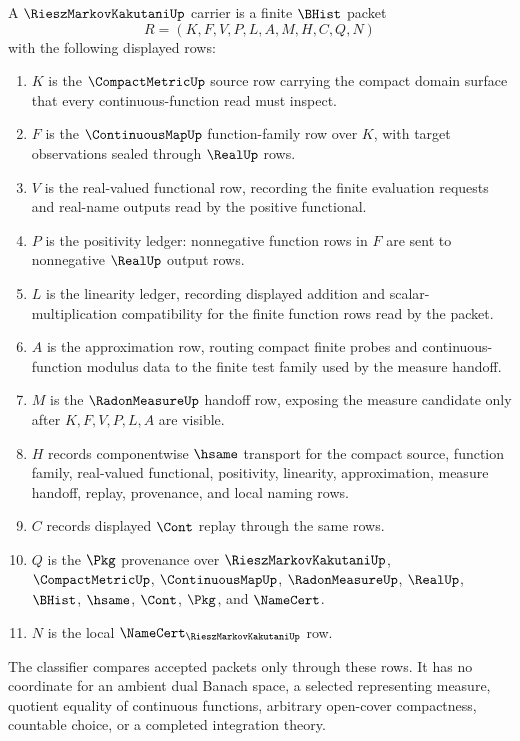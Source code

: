 \begin{definition}
\label{def:riesz-markov-kakutani-carrier}
A $\RieszMarkovKakutaniUp$ carrier is a finite $\BHist$ packet
$$
R=(K,F,V,P,L,A,M,H,C,Q,N)
$$
with the following displayed rows:
\begin{enumerate}
\item $K$ is the $\CompactMetricUp$ source row carrying the compact domain surface that every continuous-function read must inspect.
\item $F$ is the $\ContinuousMapUp$ function-family row over $K$, with target observations sealed through $\RealUp$ rows.
\item $V$ is the real-valued functional row, recording the finite evaluation requests and real-name outputs read by the positive functional.
\item $P$ is the positivity ledger: nonnegative function rows in $F$ are sent to nonnegative $\RealUp$ output rows.
\item $L$ is the linearity ledger, recording displayed addition and scalar-multiplication compatibility for the finite function rows read by the packet.
\item $A$ is the approximation row, routing compact finite probes and continuous-function modulus data to the finite test family used by the measure handoff.
\item $M$ is the $\RadonMeasureUp$ handoff row, exposing the measure candidate only after $K,F,V,P,L,A$ are visible.
\item $H$ records componentwise $\hsame$ transport for the compact source, function family, real-valued functional, positivity, linearity, approximation, measure handoff, replay, provenance, and local naming rows.
\item $C$ records displayed $\Cont$ replay through the same rows.
\item $Q$ is the $\Pkg$ provenance over $\RieszMarkovKakutaniUp$, $\CompactMetricUp$, $\ContinuousMapUp$, $\RadonMeasureUp$, $\RealUp$, $\BHist$, $\hsame$, $\Cont$, $\Pkg$, and $\NameCert$.
\item $N$ is the local $\NameCert_{\RieszMarkovKakutaniUp}$ row.
\end{enumerate}
The classifier compares accepted packets only through these rows. It has no coordinate for an ambient dual Banach space, a selected representing measure, quotient equality of continuous functions, arbitrary open-cover compactness, countable choice, or a completed integration theory.
\end{definition}


